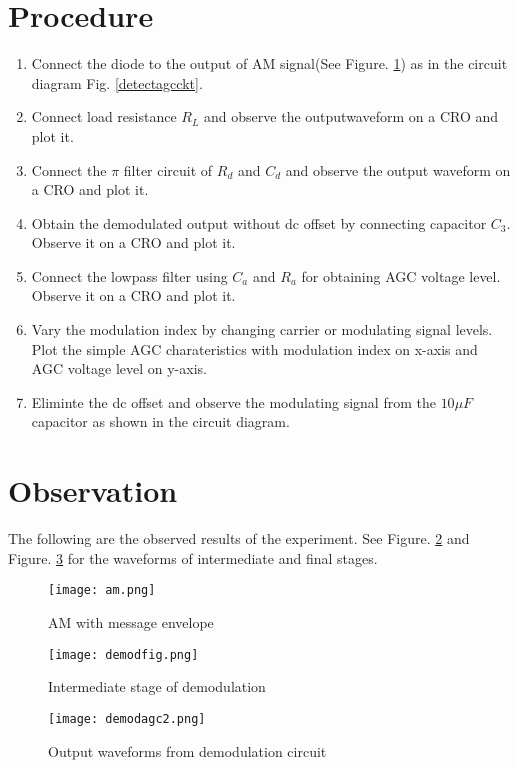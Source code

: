 \section*{Procedure}
\begin{enumerate}
\item
Connect the diode to the output of AM signal(See Figure. \ref{amenv}) as in the circuit diagram Fig. \ref{detectagcckt}.
\item
Connect load resistance $R_L$ and observe the outputwaveform on a CRO and plot it.
\item
Connect the $\pi$ filter circuit of $R_d$ and $C_d$ and observe the output waveform on a CRO and plot it.
\item
Obtain the demodulated output without dc offset by connecting capacitor $C_3$. Observe it on a CRO and plot it.
\item
Connect the lowpass filter using $C_a$ and $R_a$ for obtaining AGC voltage level. Observe it on a CRO and plot it.
\item Vary the modulation index by changing carrier or modulating signal levels. Plot the simple AGC charateristics with modulation index on x-axis and AGC voltage level on y-axis.
\item
Eliminte the dc offset and observe the modulating signal from the $10\mu F$ capacitor as shown in the circuit diagram.
\end{enumerate}
\section*{Observation}
The following are the observed results of the experiment. See Figure. \ref{aminter} and Figure. \ref{demodagcwaves} for the waveforms of intermediate and final stages.
\begin{figure}
\texttt{[image: am.png]}
\caption{AM with message envelope}
\label{amenv}
\end{figure}
\begin{figure}
\texttt{[image: demodfig.png]}
\caption{Intermediate stage of demodulation}
\label{aminter}

\end{figure}
\begin{figure}
\texttt{[image: demodagc2.png]}
\caption{Output waveforms from demodulation circuit}
\label{demodagcwaves}
\end{figure}

